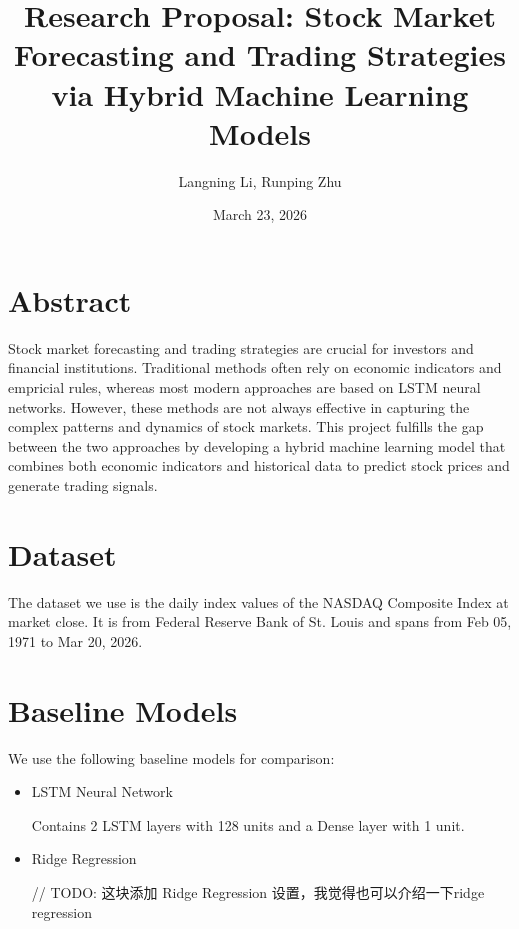 \documentclass[12pt, a4paper]{article}
\title{Research Proposal: Stock Market Forecasting and Trading Strategies via Hybrid Machine Learning Models}
\author{Langning Li, Runping Zhu}
\date{March 23, 2026}
\begin{document}
\maketitle

\section{Abstract}
Stock market forecasting and trading strategies are crucial for investors and financial institutions. Traditional methods often rely on economic indicators and empricial rules, whereas most modern approaches are based on LSTM neural networks. However, these methods are not always effective in capturing the complex patterns and dynamics of stock markets. This project fulfills the gap between the two approaches by developing a hybrid machine learning model that combines both economic indicators and historical data to predict stock prices and generate trading signals.

\section{Dataset}

The dataset we use is the daily index values of the NASDAQ Composite Index at market close. It is from Federal Reserve Bank of St. Louis and spans from Feb 05, 1971 to Mar 20, 2026.

\section{Baseline Models}
We use the following baseline models for comparison:
\begin{itemize}
    \item LSTM Neural Network
    
    Contains 2 LSTM layers with 128 units and a Dense layer with 1 unit.
    
    \item Ridge Regression
    
    // TODO: 这块添加 Ridge Regression 设置，我觉得也可以介绍一下ridge regression
\end{itemize}
\end{document}

